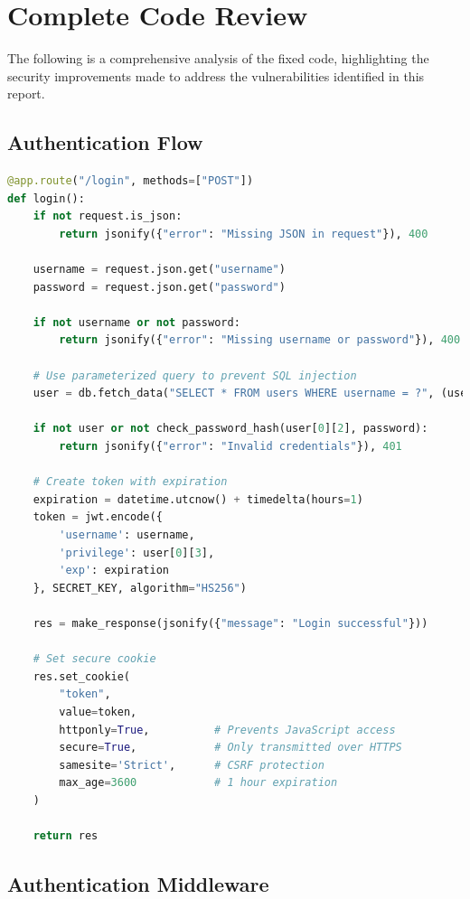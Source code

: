 \documentclass[11pt,a4paper]{article}
\begin{document}
\vspace{2300pt}
\section{Complete Code Review}

The following is a comprehensive analysis of the fixed code, highlighting the security improvements made to address the vulnerabilities identified in this report.

\subsection{Authentication Flow}

\begin{lstlisting}[language=Python]
@app.route("/login", methods=["POST"])
def login():
    if not request.is_json:
        return jsonify({"error": "Missing JSON in request"}), 400
        
    username = request.json.get("username")
    password = request.json.get("password")
    
    if not username or not password:
        return jsonify({"error": "Missing username or password"}), 400
    
    # Use parameterized query to prevent SQL injection
    user = db.fetch_data("SELECT * FROM users WHERE username = ?", (username,))
    
    if not user or not check_password_hash(user[0][2], password):
        return jsonify({"error": "Invalid credentials"}), 401
    
    # Create token with expiration
    expiration = datetime.utcnow() + timedelta(hours=1)
    token = jwt.encode({
        'username': username,
        'privilege': user[0][3],
        'exp': expiration
    }, SECRET_KEY, algorithm="HS256")
    
    res = make_response(jsonify({"message": "Login successful"}))
    
    # Set secure cookie
    res.set_cookie(
        "token", 
        value=token, 
        httponly=True,          # Prevents JavaScript access
        secure=True,            # Only transmitted over HTTPS
        samesite='Strict',      # CSRF protection
        max_age=3600            # 1 hour expiration
    )
    
    return res
\end{lstlisting}

\subsection{Authentication Middleware}
\end{document}
